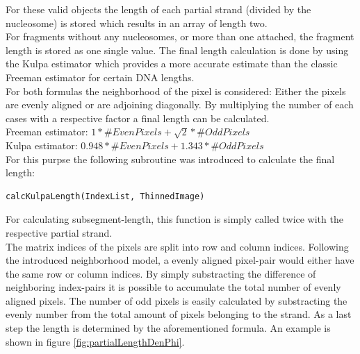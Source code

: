 \documentclass{article}
\begin{document}
For these valid objects the length of each partial strand (divided by the nucleosome) is stored which results in an array of length two. \\
For fragments without any nucleosomes, or more than one attached, the fragment length is stored as one single value.
The final length calculation is done by using the Kulpa estimator which provides a more accurate estimate than the classic Freeman estimator \cite{rivetti2001accurate} for certain DNA lengths. \\
For both formulas the neighborhood of the pixel is considered: Either the pixels are evenly aligned or are adjoining diagonally. By multiplying the number of each cases with a respective factor a final length can be calculated. \\

Freeman estimator: $ 1 * \#EvenPixels + \sqrt{2} * \#OddPixels$ \\
Kulpa estimator: $0.948 * \#EvenPixels + 1.343 * \#OddPixels$ \\

For this purpse the following subroutine was introduced to calculate the final length:
\begin{verbatim}
calcKulpaLength(IndexList, ThinnedImage)
\end{verbatim}
For calculating subsegment-length, this function is simply called twice with the respective partial strand. \\
The matrix indices of the pixels are split into row and column indices. Following the introduced neighborhood model, a evenly aligned pixel-pair would either have the same row or column indices. By simply substracting the difference of neighboring index-pairs it is possible to accumulate the total number of evenly aligned pixels. The number of odd pixels is easily calculated by substracting the evenly number from the total amount of pixels belonging to the strand. As a last step the length is determined by the aforementioned formula. An example is shown in figure \ref{fig:partialLengthDenPhi}.
\end{document}
